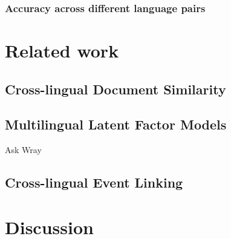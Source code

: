 \documentclass[twoside,11pt]{article}
\begin{document}
\subsubsection{Accuracy across different language pairs}


\section{Related work}

\subsection{Cross-lingual Document Similarity}

\subsection{Multilingual Latent Factor Models}

Ask Wray

\subsection{Cross-lingual Event Linking}


\section{Discussion}


\vskip 0.2in


\end{document}

